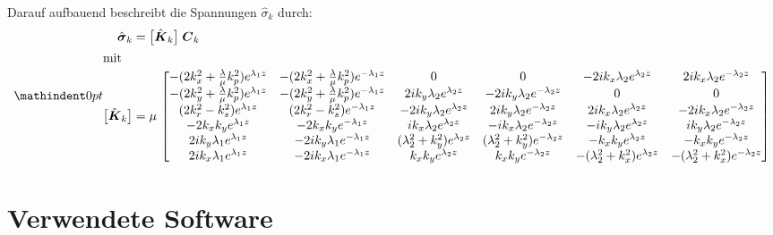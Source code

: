 Darauf aufbauend beschreibt \cite{Mueller2007} die Spannungen \(\hat{\sigma}_{k}\) durch:
\begin{subequations}\label{eq:sigmaHc_block}
	{%
		\setlength{\mathindent}{0pt}
		\begin{align}
			\hat{\boldsymbol{\sigma}}_{k}
			&= \bigl[\hat{\boldsymbol{K}}_{k}\bigr]\;\boldsymbol{C}_{k}
			\label{eq:sigma_equals_KC}\\
			\intertext{mit}
			\bigl[\hat{\boldsymbol{K}}_{k}\bigr]
			&= \mu\,
			\begin{bmatrix}
				-(2k_x^{2}+\tfrac{\lambda}{\mu}k_p^{2})e^{\lambda_{1}z} &
				-(2k_x^{2}+\tfrac{\lambda}{\mu}k_p^{2})e^{-\lambda_{1}z} & 0 & 0 &
				-2i k_x \lambda_{2}e^{\lambda_{2}z} & 2i k_x \lambda_{2}e^{-\lambda_{2}z} \\
				-(2k_y^{2}+\tfrac{\lambda}{\mu}k_p^{2})e^{\lambda_{1}z} &
				-(2k_y^{2}+\tfrac{\lambda}{\mu}k_p^{2})e^{-\lambda_{1}z} &
				2i k_y \lambda_{2}e^{\lambda_{2}z} & -2i k_y \lambda_{2}e^{-\lambda_{2}z} & 0 & 0 \\
				(2k_r^{2}-k_s^{2})e^{\lambda_{1}z} &
				(2k_r^{2}-k_s^{2})e^{-\lambda_{1}z} &
				-2i k_y \lambda_{2}e^{\lambda_{2}z} & 2i k_y \lambda_{2}e^{-\lambda_{2}z} &
				2i k_x \lambda_{2}e^{\lambda_{2}z} & -2i k_x \lambda_{2}e^{-\lambda_{2}z} \\
				-2k_x k_y e^{\lambda_{1}z} & -2k_x k_y e^{-\lambda_{1}z} &
				i k_x \lambda_{2}e^{\lambda_{2}z} & -i k_x \lambda_{2}e^{-\lambda_{2}z} &
				-i k_y \lambda_{2}e^{\lambda_{2}z} & i k_y \lambda_{2}e^{-\lambda_{2}z} \\
				2i k_y \lambda_{1}e^{\lambda_{1}z} & -2i k_y \lambda_{1}e^{-\lambda_{1}z} &
				(\lambda_{2}^{2}+k_y^{2})e^{\lambda_{2}z} & (\lambda_{2}^{2}+k_y^{2})e^{-\lambda_{2}z} &
				-k_x k_y e^{\lambda_{2}z} & -k_x k_y e^{-\lambda_{2}z} \\
				2i k_x \lambda_{1}e^{\lambda_{1}z} & -2i k_x \lambda_{1}e^{-\lambda_{1}z} &
				k_x k_y e^{\lambda_{2}z} & k_x k_y e^{-\lambda_{2}z} &
				-(\lambda_{2}^{2}+k_x^{2})e^{\lambda_{2}z} & -(\lambda_{2}^{2}+k_x^{2})e^{-\lambda_{2}z}
			\end{bmatrix}
			\label{eq:Kk_matrix}
		\end{align}
	}%
\end{subequations}



\section{Verwendete Software}
\label{cha:software}

